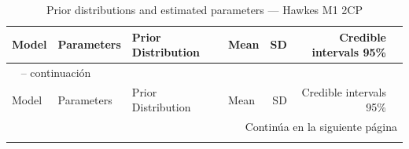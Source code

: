 \begin{longtable}{llllrrr}
\caption{Prior distributions and estimated parameters --- Hawkes M1 2CP} \label{tab:hawkes_params_2cp} \\
\toprule
Model & Parameters & Prior Distribution & Mean & SD & Credible intervals 95\% \\
\midrule
\endfirsthead

\multicolumn{7}{l}{\tablename\ \thetable{} -- continuaci\'{o}n} \\
\toprule
Model & Parameters & Prior Distribution & Mean & SD & Credible intervals 95\% \\
\midrule
\endhead

\midrule
\multicolumn{7}{r}{Contin\'{u}a en la siguiente p\'{a}gina} \\
\endfoot

\bottomrule
\endlastfoot


\end{longtable}
